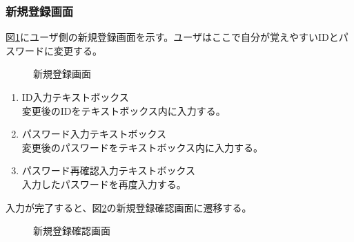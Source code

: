 \documentclass[a4j]{jarticle}
\begin{document}
\subsubsection{新規登録画面}
図\ref{fig:subscribe_user}にユーザ側の新規登録画面を示す。ユーザはここで自分が覚えやすいIDとパスワードに変更する。
\begin{figure}[H]
\centering
{}
\caption{新規登録画面}
\label{fig:subscribe_user}
\end{figure}
\begin{enumerate}
  \renewcommand{\labelenumi}{\textcircled{\scriptsize \theenumi}}

\item ID入力テキストボックス\\
変更後のIDをテキストボックス内に入力する。
\item パスワード入力テキストボックス\\
変更後のパスワードをテキストボックス内に入力する。
\item パスワード再確認入力テキストボックス\\
入力したパスワードを再度入力する。
\end{enumerate}
入力が完了すると、図\ref{fig:subscribe_ok}の新規登録確認画面に遷移する。
\begin{figure}[H]
\centering
{}
\caption{新規登録確認画面}
\label{fig:subscribe_ok}
\end{figure}
\end{document}
